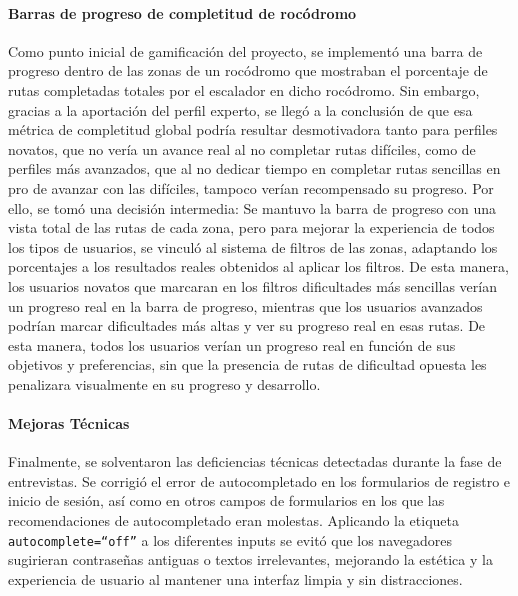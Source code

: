 \paragraph{Barras de progreso de completitud de rocódromo}
Como punto inicial de gamificación del proyecto, se implementó una barra de progreso dentro de las zonas de un rocódromo que mostraban el porcentaje de rutas completadas totales por el escalador en dicho rocódromo. Sin embargo, gracias a la aportación del perfil experto, se llegó a la conclusión de que esa métrica de completitud global podría resultar desmotivadora tanto para perfiles novatos, que no vería un avance real al no completar rutas difíciles, como de perfiles más avanzados, que al no dedicar tiempo en completar rutas sencillas en pro de avanzar con las difíciles, tampoco verían recompensado su progreso. Por ello, se tomó una decisión intermedia: Se mantuvo la barra de progreso con una vista total de las rutas de cada zona, pero para mejorar la experiencia de todos los tipos de usuarios, se vinculó al sistema de filtros de las zonas, adaptando los porcentajes a los resultados reales obtenidos al aplicar los filtros. De esta manera, los usuarios novatos que marcaran en los filtros dificultades más sencillas verían un progreso real en la barra de progreso, mientras que los usuarios avanzados podrían marcar dificultades más altas y ver su progreso real en esas rutas. De esta manera, todos los usuarios verían un progreso real en función de sus objetivos y preferencias, sin que la presencia de rutas de dificultad opuesta les penalizara visualmente en su progreso y desarrollo.

\paragraph{Mejoras Técnicas}
Finalmente, se solventaron las deficiencias técnicas detectadas durante la fase de entrevistas. Se corrigió el error de autocompletado en los formularios de registro e inicio de sesión, así como en otros campos de formularios en los que las recomendaciones de autocompletado eran molestas. Aplicando la etiqueta \texttt{autocomplete=``off''} a los diferentes inputs se evitó que los navegadores sugirieran contraseñas antiguas o textos irrelevantes, mejorando la estética y la experiencia de usuario al mantener una interfaz limpia y sin distracciones.

